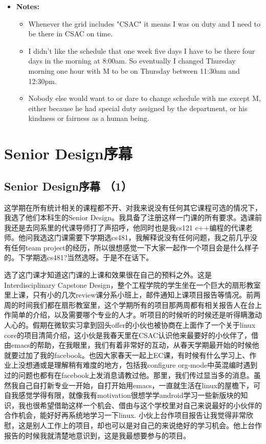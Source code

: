 \documentclass[12pt]{book}
\begin{document}
\begin{itemize}
\item \textbf{Notes:} 
\begin{itemize}
\item Whenever the grid includes "CSAC" it means I was on duty and I need to be there in CSAC on time.
\item I didn't like the schedule that one week five days I have to be there four days in the morning at 8:00am. So eventually I changed Thursday morning one hour with M to be on Thursday between 11:30am and 12:30pm.
\item Nobody else would want to or dare to change schedule with me except M, either because he had special duty assigned by the department, or his kindness or fairness as a human being.
\end{itemize}
\end{itemize}

\chapter{Senior Design序幕}
\label{sec-13}
\section{Senior Design序幕 （1）}
\label{sec-13-1}
这学期在所有统计相关的课程都不开、对我来说没有任何其它课程可选的情况下，我选了他们本科生的Senior Design。我具备了注册这样一门课的所有要求。选课前我还是去同系里的代课导师打了声招呼，他同时也是我cs121 c++编程的代课老师。他问我选这门课需要下学期选cs481，我解释说没有任何问题，我之前几乎没有任何team project的经历，所以很想感觉一下大家一起作一个项目会是什么样子的。下学期选cs481?当然选呀。于是不在话下。

选了这门课才知道这门课的上课和效果很在自己的预料之外。这是Interdisciplinary Capstone Design，整个工程学院的学生坐在一个巨大的扇形教室里上课，只有小的几次review课分系小班上，邮件通知上课项目报告等情况。前两周的时间我们都在扇形教室里，这个学期所有的项目那两周都有相关报告人在台上作简单的介绍，以及需要哪个专业的人才。听项目的时候听的时候还是听得瞒激动人心的。假期在微软实习拿到回头offer的小伙也被协商在上面作了一个关于linux core的项目清简介绍，这小伙是我春天里在CSAC认识他来最要好的小伙伴了，借由emacs的帮助，在我眼里，我们有着非常好的互动，从春天学期最开始的时候他就要过加了我的facebook。也因大家春天一起上EC课，有时候有什么学习上、作业上没想通或是理解稍有难度的地方，包括我configure org-mode中英混编时遇到过的问题也都有在facebook上发消息请教过他。那里，我们传过显当多的消息。虽然我自己自打新专业一开始，自打开始用emacs，一直就生活在linux的屋檐下，可自我感觉学得有限，就像我有motivation很想学学android学习一些新版块的知识，我也很希望借助这样一个机会、借由与这个学校里对自己来说最好的小伙伴的合作机会，能好好再系统地学习一下linux. 小伙上台作项目报告让我觉得非常欣慰，这是别人工作上的项目，却也可以是对自己的来说绝好的学习机会。他上台作报告的时候我就清楚地意识到，这是我最想要参与的项目。
\end{document}
